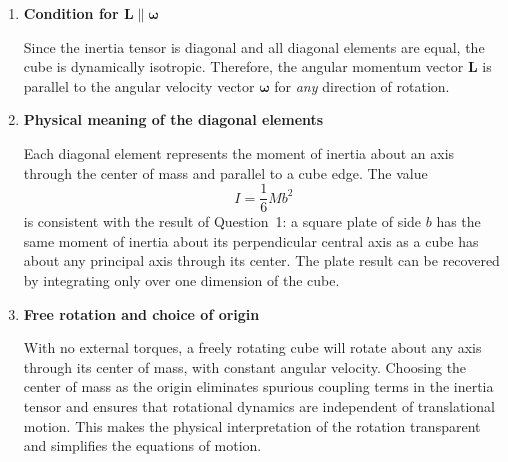 \documentclass[../main.tex]{subfiles}
\begin{document}
\begin{enumerate}
\begin{enumerate}
\item \textbf{Condition for $\boldsymbol L \parallel \boldsymbol\omega$}

Since the inertia tensor is diagonal and all diagonal elements are equal, the cube is dynamically isotropic.  
Therefore, the angular momentum vector $\boldsymbol L$ is parallel to the angular velocity vector $\boldsymbol\omega$ for \emph{any} direction of rotation.

\item \textbf{Physical meaning of the diagonal elements}

Each diagonal element represents the moment of inertia about an axis through the center of mass and parallel to a cube edge.  
The value
\[
I=\frac{1}{6}Mb^2
\]
is consistent with the result of Question~1: a square plate of side $b$ has the same moment of inertia about its perpendicular central axis as a cube has about any principal axis through its center. The plate result can be recovered by integrating only over one dimension of the cube.

\item \textbf{Free rotation and choice of origin}

With no external torques, a freely rotating cube will rotate about any axis through its center of mass, with constant angular velocity.  
Choosing the center of mass as the origin eliminates spurious coupling terms in the inertia tensor and ensures that rotational dynamics are independent of translational motion. This makes the physical interpretation of the rotation transparent and simplifies the equations of motion.

\end{enumerate}

\end{enumerate}
\end{document}
